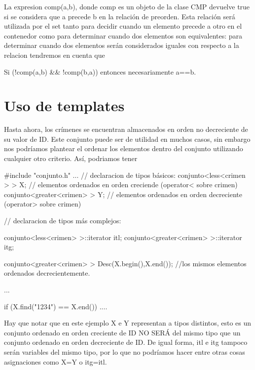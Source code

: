La expresion comp(a,b), donde comp es un objeto de la clase C\+M\+P devuelve true si se considera que a precede b en la relación de preorden. Esta relación será utilizada por el set tanto para decidir cuando un elemento precede a otro en el contenedor como para determinar cuando dos elementos son equivalentes\+: para determinar cuando dos elementos serán considerados iguales con respecto a la relacion tendremos en cuenta que \begin{DoxyItemize}
\item Si (!comp(a,b) \&\& !comp(b,a)) entonces necesariamente a==b.\end{DoxyItemize}
\hypertarget{index_platillas}{}\section{Uso de templates}\label{index_platillas}
Hasta ahora, los crímenes se encuentran almacenados en orden no decreciente de su valor de I\+D. Este conjunto puede ser de utilidad en muchos casos, sin embargo nos podríamos plantear el ordenar los elementos dentro del conjunto utilizando cualquier otro criterio. Así, podriamos tener


\begin{DoxyCode}
\textcolor{preprocessor}{#include "conjunto.h"}
...
\textcolor{comment}{// declaracion de tipos básicos:}
conjunto<less<crimen > > X;  \textcolor{comment}{// elementos ordenados en orden creciende  (operator< sobre crimen)}
conjunto<greater<crimen> > Y; \textcolor{comment}{// elementos ordenados en orden decreciente (operator> sobre crimen)}

\textcolor{comment}{// declaracion de tipos más complejos:}

conjunto<less<crimen> >::iterator itl;
conjunto<greater<crimen> >::iterator itg;

conjunto<greater<crimen> > Desc(X.begin(),X.end()); \textcolor{comment}{//los mismos elementos ordenados decrecientemente.}

... 

\textcolor{keywordflow}{if} (X.find(\textcolor{stringliteral}{"1234"}) == X.end()) 
   ....
\end{DoxyCode}


Hay que notar que en este ejemplo X e Y representan a tipos distintos, esto es un conjunto ordenado en orden creciente de I\+D N\+O S\+E\+RÁ del mismo tipo que un conjunto ordenado en orden decreciente de I\+D. De igual forma, itl e itg tampoco serán variables del mismo tipo, por lo que no podríamos hacer entre otras cosas asignaciones como X=Y o itg=itl.


